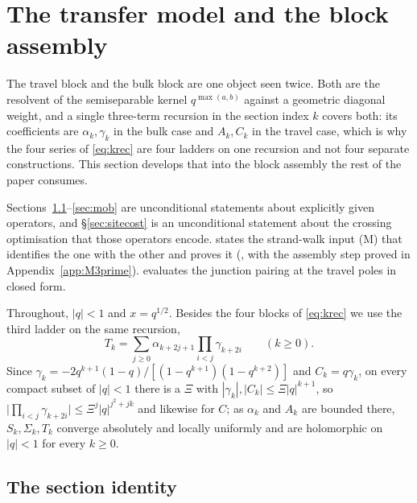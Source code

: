 \documentclass[11pt]{article}
\theoremstyle{plain}
\theoremstyle{definition}
\theoremstyle{remark}
\begin{document}
\section{The transfer model and the block assembly}\label{sec:assembly}

The travel block and the bulk block are one object seen twice. Both are the resolvent of the
semiseparable kernel $q^{\max(a,b)}$ against a geometric diagonal weight, and a single three-term
recursion in the section index $k$ covers both: its coefficients are $\alpha_k,\gamma_k$ in the
bulk case and $A_k,C_k$ in the travel case, which is why the four series of \eqref{eq:krec} are
four ladders on one recursion and not four separate constructions. This section develops that into
the block assembly the rest of the paper consumes.

Sections~\ref{sec:sect}--\ref{sec:mob} are unconditional statements about explicitly given
operators, and \S\ref{sec:sitecost} is an unconditional statement about the crossing optimisation
that those operators encode. {\cite[Section \textup{sec:modelassembly}]{Bonfioli2026bA}} states the strand-walk input
\textup{(M)} that identifies the one with the other and proves it ({\cite[Theorem ``the transfer model \textup{(M)}'', \textup{thm:model}]{Bonfioli2026bA}}, with
the assembly step proved in Appendix~\ref{app:M3prime}). {\cite[Section \textup{sec:RJ}]{Bonfioli2026bA}} evaluates the junction
pairing at the travel poles in closed form.

Throughout, $|q|<1$ and $x=q^{1/2}$. Besides the four blocks of \eqref{eq:krec} we use the third
ladder on the same recursion,
\begin{equation}\label{eq:Tladder}
   T_k=\sum_{j\ge0}\alpha_{k+2j+1}\prod_{i<j}\gamma_{k+2i}\qquad(k\ge0).
\end{equation}
Since $\gamma_k=-2q^{k+1}(1-q)/[(1-q^{k+1})(1-q^{k+2})]$ and $C_k=q\gamma_k$, on every compact
subset of $|q|<1$ there is a $\Xi$ with $|\gamma_k|,|C_k|\le\Xi|q|^{k+1}$, so
$\bigl|\prod_{i<j}\gamma_{k+2i}\bigr|\le\Xi^{j}|q|^{j^2+jk}$ and likewise for $C$; as
$\alpha_k$ and $A_k$ are bounded there, $S_k,\Sigma_k,T_k$ converge absolutely and locally
uniformly and are holomorphic on $|q|<1$ for every $k\ge0$.

\subsection{The section identity}\label{sec:sect}
\end{document}
